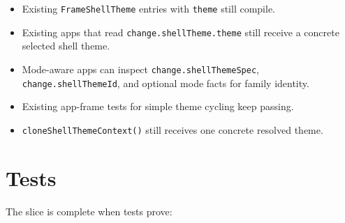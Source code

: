 \begin{itemize}
\tightlist
\item
  Existing \texttt{F\allowbreak{}r\allowbreak{}a\allowbreak{}m\allowbreak{}e\allowbreak{}S\allowbreak{}h\allowbreak{}e\allowbreak{}l\allowbreak{}l\allowbreak{}T\allowbreak{}h\allowbreak{}e\allowbreak{}m\allowbreak{}e} entries with \texttt{t\allowbreak{}h\allowbreak{}e\allowbreak{}m\allowbreak{}e} still compile.
\item
  Existing apps that read \texttt{c\allowbreak{}h\allowbreak{}a\allowbreak{}n\allowbreak{}g\allowbreak{}e\allowbreak{}.\allowbreak{}s\allowbreak{}h\allowbreak{}e\allowbreak{}l\allowbreak{}l\allowbreak{}T\allowbreak{}h\allowbreak{}e\allowbreak{}m\allowbreak{}e\allowbreak{}.\allowbreak{}t\allowbreak{}h\allowbreak{}e\allowbreak{}m\allowbreak{}e} still receive a concrete selected shell theme.
\item
  Mode-aware apps can inspect \texttt{c\allowbreak{}h\allowbreak{}a\allowbreak{}n\allowbreak{}g\allowbreak{}e\allowbreak{}.\allowbreak{}s\allowbreak{}h\allowbreak{}e\allowbreak{}l\allowbreak{}l\allowbreak{}T\allowbreak{}h\allowbreak{}e\allowbreak{}m\allowbreak{}e\allowbreak{}S\allowbreak{}p\allowbreak{}e\allowbreak{}c}, \texttt{c\allowbreak{}h\allowbreak{}a\allowbreak{}n\allowbreak{}g\allowbreak{}e\allowbreak{}.\allowbreak{}s\allowbreak{}h\allowbreak{}e\allowbreak{}l\allowbreak{}l\allowbreak{}T\allowbreak{}h\allowbreak{}e\allowbreak{}m\allowbreak{}e\allowbreak{}I\allowbreak{}d}, and optional mode facts for family identity.
\item
  Existing app-frame tests for simple theme cycling keep passing.
\item
  \texttt{c\allowbreak{}l\allowbreak{}o\allowbreak{}n\allowbreak{}e\allowbreak{}S\allowbreak{}h\allowbreak{}e\allowbreak{}l\allowbreak{}l\allowbreak{}T\allowbreak{}h\allowbreak{}e\allowbreak{}m\allowbreak{}e\allowbreak{}C\allowbreak{}o\allowbreak{}n\allowbreak{}t\allowbreak{}e\allowbreak{}x\allowbreak{}t\allowbreak{}(\allowbreak{})} still receives one concrete resolved theme.
\end{itemize}

\section{Tests}\label{record-181-tests}

The slice is complete when tests prove:

